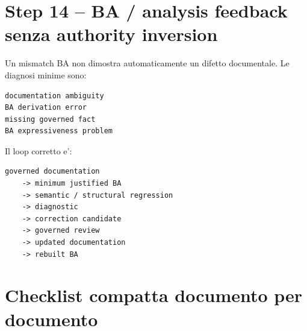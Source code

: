 \documentclass[11pt,a4paper]{article}
\begin{document}
\section{Step 14 -- BA / analysis feedback senza authority inversion}

Un mismatch BA non dimostra automaticamente un difetto documentale. Le diagnosi minime sono:

\begin{lstlisting}
documentation ambiguity
BA derivation error
missing governed fact
BA expressiveness problem
\end{lstlisting}

Il loop corretto e':

\begin{lstlisting}
governed documentation
    -> minimum justified BA
    -> semantic / structural regression
    -> diagnostic
    -> correction candidate
    -> governed review
    -> updated documentation
    -> rebuilt BA
\end{lstlisting}

\section{Checklist compatta documento per documento}
\end{document}
